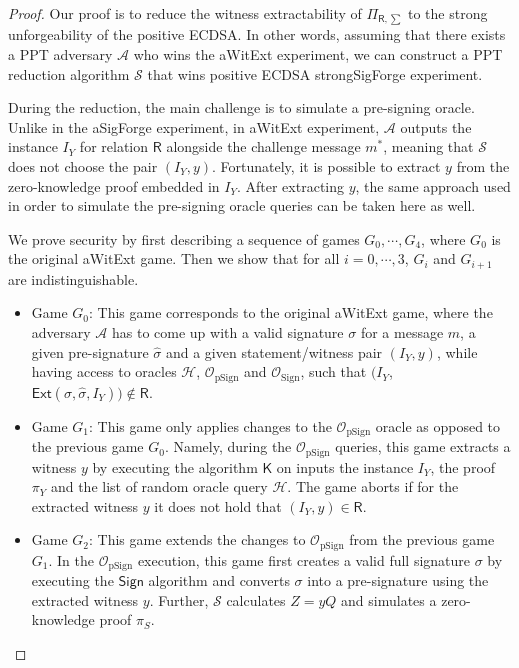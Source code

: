 \documentclass{llncs}
\begin{document}
\begin{proof}
Our proof is to reduce the witness extractability of $\Pi_{\mathsf{R},\sum}$ to the strong unforgeability of the positive ECDSA. In other words, assuming that there exists a PPT adversary $\mathcal{A}$ who wins the aWitExt experiment, we can construct a PPT reduction algorithm $\mathcal{S}$ that wins positive ECDSA strongSigForge experiment.

During the reduction, the main challenge is to simulate a pre-signing oracle. Unlike in the aSigForge experiment, in aWitExt experiment, $\mathcal{A}$ outputs the instance $I_Y$ for relation $\mathsf{R}$ alongside the challenge message $m^*$, meaning that $\mathcal{S}$ does not choose the pair $(I_Y, y)$.  Fortunately, it is possible to extract $y$ from the zero-knowledge proof embedded in $I_Y$. After extracting $y$, the same approach used in order to simulate the pre-signing oracle queries can be taken here as well.

We prove security by first describing a sequence of games $G_0,\cdots,G_4$, where $G_0$ is the original aWitExt game. Then we show that for all $i = 0,\cdots,3$, $G_i$ and $G_{i+1}$ are indistinguishable.

\begin{itemize}
\item Game $G_0$: This game corresponds to the original aWitExt game, where the adversary $\mathcal{A}$ has to come up with a valid signature $\sigma$ for a message $m$, a given pre-signature $\hat{\sigma}$ and a given statement/witness pair $(I_Y, y)$, while having access to oracles $\mathcal{H}$, $\mathcal{O}_{\text{pSign}}$ and $\mathcal{O}_{\text{Sign}}$, such that $(I_Y$, $\mathsf{Ext}(\sigma, \hat{\sigma}, I_Y)) \notin \mathsf{R}$. 

\item Game $G_1$: This game only applies changes to the $\mathcal{O}_{\text{pSign}}$ oracle as opposed to the previous game $G_0$. Namely, during the $\mathcal{O}_{\text{pSign}}$ queries, this game extracts a witness $y$ by executing the algorithm $\mathsf{K}$ on inputs the instance $I_Y$, the proof $\pi_Y$ and the list of random oracle query $\mathcal{H}$. The game aborts if for the extracted witness $y$ it does not hold that $(I_Y, y) \in \mathsf{R}$.

\item Game $G_2$: This game extends the changes to $\mathcal{O}_{\text{pSign}}$ from the previous game $G_1$. In the $\mathcal{O}_{\text{pSign}}$ execution, this game first creates a valid full signature $\sigma$ by executing the $\mathsf{Sign}$ algorithm and converts $\sigma$ into a pre-signature using the extracted witness $y$. Further, $\mathcal{S}$ calculates $Z=yQ$ and simulates a zero-knowledge proof $\pi_S$.


\end{itemize}
\end{proof}
\end{document}
